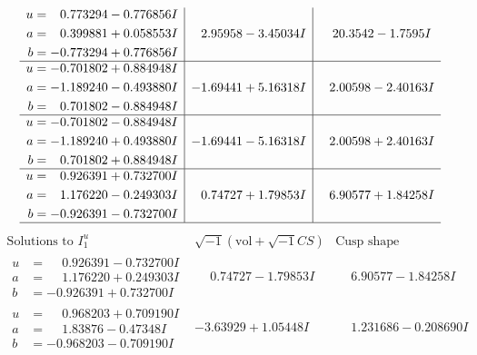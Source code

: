 \documentclass[1p]{elsarticle_modified}
\theoremstyle{definition}
\newcommand{\I}{\sqrt{-1}}
\begin{document}
$$\begin{array}{c|c|c}
\begin{aligned}
u &= \phantom{-}0.773294 - 0.776856 I \\
a &= \phantom{-}0.399881 + 0.058553 I \\
b &= -0.773294 + 0.776856 I\end{aligned}
 & \phantom{-}2.95958 - 3.45034 I & \phantom{-}20.3542 - 1.7595 I \\ \hline\begin{aligned}
u &= -0.701802 + 0.884948 I \\
a &= -1.189240 - 0.493880 I \\
b &= \phantom{-}0.701802 - 0.884948 I\end{aligned}
 & -1.69441 + 5.16318 I & \phantom{-}2.00598 - 2.40163 I \\ \hline\begin{aligned}
u &= -0.701802 - 0.884948 I \\
a &= -1.189240 + 0.493880 I \\
b &= \phantom{-}0.701802 + 0.884948 I\end{aligned}
 & -1.69441 - 5.16318 I & \phantom{-}2.00598 + 2.40163 I \\ \hline\begin{aligned}
u &= \phantom{-}0.926391 + 0.732700 I \\
a &= \phantom{-}1.176220 - 0.249303 I \\
b &= -0.926391 - 0.732700 I\end{aligned}
 & \phantom{-}0.74727 + 1.79853 I & \phantom{-}6.90577 + 1.84258 I\\
 \hline 
 \end{array}$$\newpage$$\begin{array}{c|c|c}  
\text{Solutions to }I^u_{1}& \I (\text{vol} + \sqrt{-1}CS) & \text{Cusp shape}\\
 \hline 
\begin{aligned}
u &= \phantom{-}0.926391 - 0.732700 I \\
a &= \phantom{-}1.176220 + 0.249303 I \\
b &= -0.926391 + 0.732700 I\end{aligned}
 & \phantom{-}0.74727 - 1.79853 I & \phantom{-}6.90577 - 1.84258 I \\ \hline\begin{aligned}
u &= \phantom{-}0.968203 + 0.709190 I \\
a &= \phantom{-}1.83876 - 0.47348 I \\
b &= -0.968203 - 0.709190 I\end{aligned}
 & -3.63929 + 1.05448 I & \phantom{-}1.231686 - 0.208690 I \\ \hline\begin{aligned}

\end{aligned}
\end{array}$$
\end{document}
